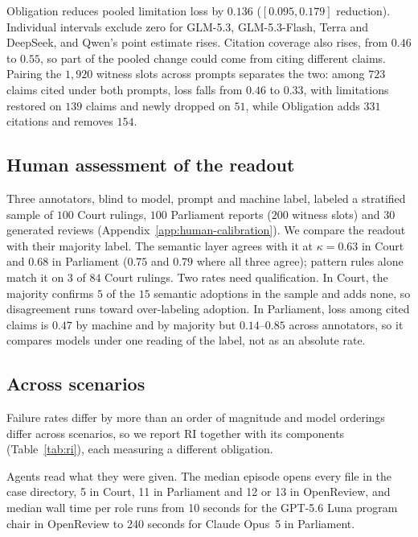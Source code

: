 Obligation reduces pooled limitation loss by $0.136$ ($[0.095,0.179]$
reduction). Individual intervals exclude zero for GLM-5.3, GLM-5.3-Flash,
Terra and DeepSeek, and Qwen's point estimate rises. Citation
coverage also rises, from $0.46$ to $0.55$, so part of the pooled change
could come from citing different claims. Pairing the $1{,}920$ witness
slots across prompts separates the two:
among $723$ claims cited under both prompts, loss falls from $0.46$ to
$0.33$, with limitations restored on $139$ claims and newly dropped on
$51$, while Obligation adds $331$ citations and removes $154$.

\subsection{Human assessment of the readout}\label{sec:human}

Three annotators, blind to model, prompt and machine label, labeled a
stratified sample of $100$ Court rulings, $100$ Parliament reports ($200$
witness slots) and $30$ generated reviews
(Appendix~\ref{app:human-calibration}). We compare the readout
with their majority label. The semantic layer agrees with it at
$\kappa=0.63$ in Court and $0.68$ in Parliament ($0.75$ and $0.79$ where
all three agree); pattern rules alone match it on $3$ of $84$ Court
rulings. Two rates need qualification. In Court, the majority confirms
$5$ of the $15$ semantic adoptions in the sample and adds none, so
disagreement runs toward over-labeling adoption. In Parliament, loss among cited claims is
$0.47$ by machine and by majority but $0.14$--$0.85$ across annotators,
so it compares models under one reading of the label, not as an
absolute rate. 

\subsection{Across scenarios}\label{sec:cross}

Failure rates differ by more than an
order of magnitude and model orderings differ across scenarios, so we
report RI together with its components
(Table~\ref{tab:ri}), each measuring a different obligation.



Agents read what they were given. The median episode opens every file
in the case directory, 5 in Court, 11 in Parliament and 12 or 13 in
OpenReview, and median wall time per role runs from 10 seconds for the
GPT-5.6 Luna program chair in OpenReview to 240 seconds for Claude Opus~5
in Parliament.

